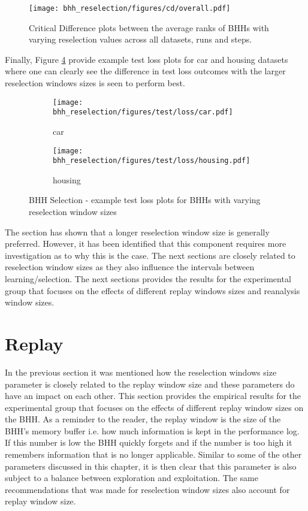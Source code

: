 \begin{figure}[htbp]
	\centering
	\texttt{[image: bhh\_reselection/figures/cd/overall.pdf]}
	\caption{Critical Difference plots between the average ranks of \Acsp{BHH} with varying reselection values across all datasets, runs and steps.}
	\label{fig:results:reselection:descriptive:cd}
\end{figure}

Finally, Figure \ref{fig:results:reselection:figures:loss} provide example test loss plots for car and housing datasets where one can clearly see the difference in test loss outcomes with the larger reselection windows sizes is seen to perform best.

\begin{figure}[htbp]
	\begin{subfigure}{0.5\textwidth}
		\centering
		\texttt{[image: bhh\_reselection/figures/test/loss/car.pdf]}
		\caption{car}
		\label{fig:results:reselection:figures:loss1}
	\end{subfigure}
	\begin{subfigure}{0.5\textwidth}
		\centering
		\texttt{[image: bhh\_reselection/figures/test/loss/housing.pdf]}
		\caption{housing}
		\label{fig:results:reselection:figures:loss2}
	\end{subfigure}
	\caption{\Acs{BHH} Selection - example test loss plots for \Acsp{BHH} with varying reselection window sizes}
	\label{fig:results:reselection:figures:loss}
\end{figure}

The section has shown that a longer reselection window size is generally preferred. However, it has been identified that this component requires more investigation as to why this is the case. The next sections are closely related to reselection window sizes as they also influence the intervals between learning/selection. The next sections provides the results for the experimental group that focuses on the effects of different replay windows sizes and reanalysis window sizes.


\section{Replay}
\label{sec:results:replay}

In the previous section it was mentioned how the reselection windows size parameter is closely related to the replay window size and these parameters do have an impact on each other. This section provides the empirical results for the experimental group that focuses on the effects of different replay window sizes on the \Ac{BHH}. As a reminder to the reader, the replay window is the size of the \Ac{BHH}'s memory buffer i.e. how much information is kept in the performance log. If this number is low the \Ac{BHH} quickly forgets and if the number is too high it remembers information that is no longer applicable. Similar to some of the other parameters discussed in this chapter, it is then clear that this parameter is also subject to a balance between exploration and exploitation. The same recommendations that was made for reselection window sizes also account for replay window size.

